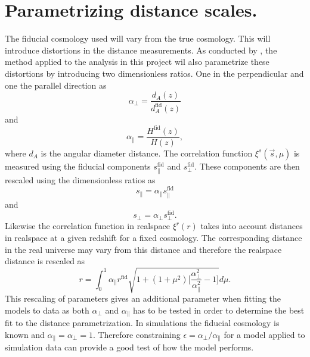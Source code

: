 \section{Parametrizing distance scales.}\label{sec:rescale_r}
The fiducial cosmology used will vary from the true cosmology. This will introduce distortions in the distance measurements. As conducted by \cite{BeyondBAO}, the method applied to the analysis in this project wil also parametrize these distortions by introducing two dimensionless ratios. One in the perpendicular and one the parallel direction as
\begin{equation}
    \alpha_\perp=\frac{d_A(z)}{d_A^{\mathrm{fid}}(z)}
\end{equation} 
and
\begin{equation}
    \alpha_\parallel=\frac{H^{\mathrm{fid}}(z)}{H(z)},
\end{equation}
where $d_A$ is the angular diameter distance. The correlation function $\xi^s(\vec{s},\mu)$ is measured using the fiducial
components $s_\parallel^\mathrm{fid}$ and $s_\perp^\mathrm{fid}$. These components are then rescaled using the dimensionless ratios as
\begin{equation}
    s_\parallel=\alpha_\parallel s_\parallel^\mathrm{fid}
\end{equation}
and 
\begin{equation}
    s_\perp = \alpha_\perp s_\perp^\mathrm{fid}.
\end{equation}
Likewise the correlation function in realspace $\xi^r(r)$ takes into account distances in realspace at a given redshift for a fixed cosmology. The corresponding distance in the real universe may vary from this distance and therefore the realspace distance is rescaled as
\begin{equation}\label{eq:r_scaling}
    r=\int_0^1\alpha_\parallel r^{\mathrm{fid}}\sqrt{1+(1+\mu^2)\Big[\frac{\alpha_\perp^2}{\alpha_\parallel^2}-1\Big]}d\mu.
\end{equation}
This rescaling of parameters gives an additional parameter when fitting the models to data as both $\alpha_\perp$ and $\alpha_\parallel$ has to be tested in order to determine the best fit to the distance parametrization. In simulations the fiducial cosmology is known and $\alpha_\parallel=\alpha_\perp=1$. Therefore constraining $\epsilon=\alpha_\perp/\alpha_\parallel$ for a model applied to simulation data can provide a good test of how the model performs.
